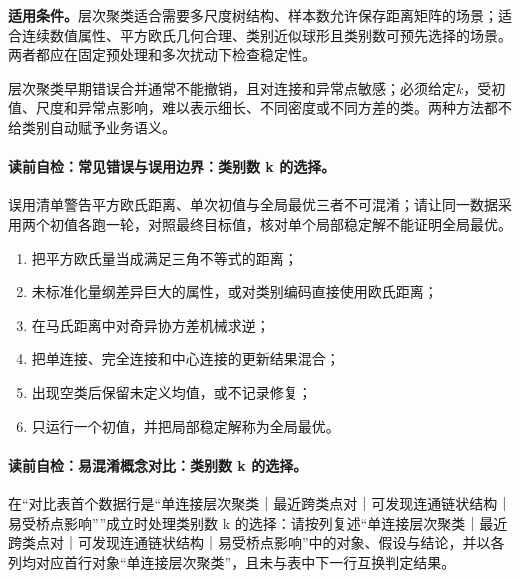 \begin{applicabilitybox}
\textbf{适用条件。}层次聚类适合需要多尺度树结构、样本数允许保存距离矩阵的场景；\kMeans{}适合连续数值属性、平方欧氏几何合理、类别近似球形且类别数可预先选择的场景。两者都应在固定预处理和多次扰动下检查稳定性。
\end{applicabilitybox}

\label{struct:V4-C02-CH29}
\begin{notapplicablebox}[title=\SLMethodLimitationsTitle]
层次聚类早期错误合并通常不能撤销，且对连接和异常点敏感；\kMeans{}必须给定$k$，受初值、尺度和异常点影响，难以表示细长、不同密度或不同方差的类。两种方法都不给类别自动赋予业务语义。
\end{notapplicablebox}

\label{struct:V4-C02-CH30}
\paragraph{读前自检：常见错误与误用边界：类别数 k 的选择。}\kMeans{}误用清单警告平方欧氏距离、单次初值与全局最优三者不可混淆；请让同一数据采用两个初值各跑一轮，对照最终目标值，核对单个局部稳定解不能证明全局最优。\par

\begin{warningbox}
\begin{enumerate}[leftmargin=2.2em]
  \item 把平方欧氏量当成满足三角不等式的距离；
  \item 未标准化量纲差异巨大的属性，或对类别编码直接使用欧氏距离；
  \item 在马氏距离中对奇异协方差机械求逆；
  \item 把单连接、完全连接和中心连接的更新结果混合；
  \item \kMeans{}出现空类后保留未定义均值，或不记录修复；
  \item 只运行一个初值，并把局部稳定解称为全局最优。
\end{enumerate}
\end{warningbox}

\label{struct:V4-C02-CH31}
\paragraph{读前自检：易混淆概念对比：类别数 k 的选择。}在“对比表首个数据行是“单连接层次聚类｜最近跨类点对｜可发现连通链状结构｜易受桥点影响””成立时处理类别数 k 的选择：请按列复述“单连接层次聚类｜最近跨类点对｜可发现连通链状结构｜易受桥点影响”中的对象、假设与结论，并以各列均对应首行对象“单连接层次聚类”，且未与表中下一行互换判定结果。\par

